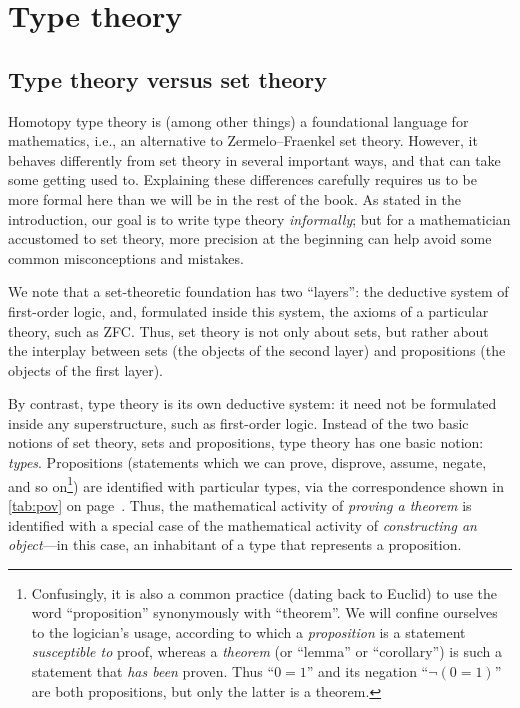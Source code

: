 \chapter{Type theory}
\label{cha:typetheory}

\section{Type theory versus set theory}
\label{sec:types-vs-sets}
\label{sec:axioms}

Homotopy type theory is (among other things) a foundational language for mathematics, i.e., an alternative to Zermelo--Fraenkel set theory.
However, it behaves differently from set theory in several important ways, and that can take some getting used to.
Explaining these differences carefully requires us to be more formal here than we will be in the rest of the book.
As stated in the introduction, our goal is to write type theory \emph{informally}; but for a mathematician accustomed to set theory, more precision at the beginning can help avoid some common misconceptions and mistakes.

We note that a set-theoretic foundation has two ``layers'': the deductive system of first-order logic, and, formulated inside this system, the axioms of a particular theory, such as ZFC.
Thus, set theory is not only about sets, but rather about the interplay between sets (the objects of the second layer) and propositions (the objects of the first layer).

By contrast, type theory is its own deductive system: it need not be formulated inside any superstructure, such as first-order logic.
Instead of the two basic notions of set theory, sets and propositions, type theory has one basic notion: \emph{types}.
Propositions (statements which we can prove, disprove, assume, negate, and so on\footnote{Confusingly, it is also a common practice (dating 
back to Euclid) to use the word ``proposition'' synonymously with ``theorem''.
  We will confine ourselves to the logician's usage, according to which a \emph{proposition} is a statement \emph{susceptible to} proof, whereas a \emph{theorem} (or ``lemma'' or ``corollary'') is such a statement that \emph{has been} proven.
Thus ``$0=1$'' and its negation ``$\neg(0=1)$'' are both propositions, but only the latter is a theorem.}) are identified with particular types, via the correspondence shown in \cref{tab:pov} on page~\pageref{tab:pov}.
Thus, the mathematical activity of \emph{proving a theorem} is identified with a special case of the mathematical activity of \emph{constructing an object}---in this case, an inhabitant of a type that represents a proposition.

